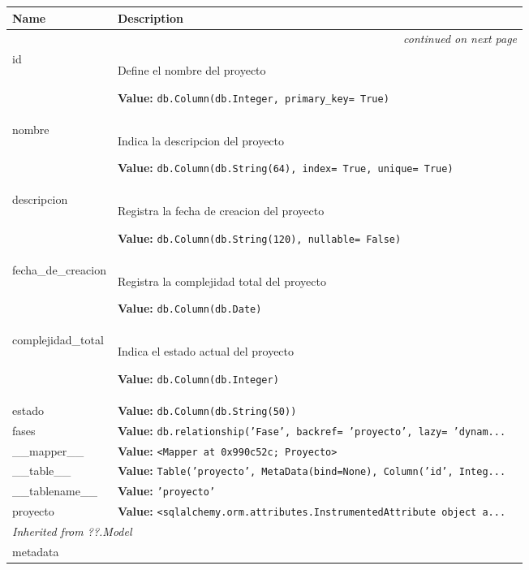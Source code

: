     \vspace{-1cm}
\hspace{\varindent}\begin{longtable}{|p{\varnamewidth}|p{\vardescrwidth}|l}
\cline{1-2}
\cline{1-2} \centering \textbf{Name} & \centering \textbf{Description}& \\
\cline{1-2}
\endhead\cline{1-2}\multicolumn{3}{r}{\small\textit{continued on next page}}\\\endfoot\cline{1-2}
\endlastfoot\raggedright i\-d\- & \raggedright Define el nombre del proyecto

\textbf{Value:} 
{\tt db.Column(db.Integer, primary\_key= True)}&\\
\cline{1-2}
\raggedright n\-o\-m\-b\-r\-e\- & \raggedright Indica la descripcion del proyecto

\textbf{Value:} 
{\tt db.Column(db.String(64), index= True, unique= True)}&\\
\cline{1-2}
\raggedright d\-e\-s\-c\-r\-i\-p\-c\-i\-o\-n\- & \raggedright Registra la fecha de creacion del proyecto

\textbf{Value:} 
{\tt db.Column(db.String(120), nullable= False)}&\\
\cline{1-2}
\raggedright f\-e\-c\-h\-a\-\_\-d\-e\-\_\-c\-r\-e\-a\-c\-i\-o\-n\- & \raggedright Registra la complejidad total del proyecto

\textbf{Value:} 
{\tt db.Column(db.Date)}&\\
\cline{1-2}
\raggedright c\-o\-m\-p\-l\-e\-j\-i\-d\-a\-d\-\_\-t\-o\-t\-a\-l\- & \raggedright Indica el estado actual del proyecto

\textbf{Value:} 
{\tt db.Column(db.Integer)}&\\
\cline{1-2}
\raggedright e\-s\-t\-a\-d\-o\- & \raggedright \textbf{Value:} 
{\tt db.Column(db.String(50))}&\\
\cline{1-2}
\raggedright f\-a\-s\-e\-s\- & \raggedright \textbf{Value:} 
{\tt db.relationship('Fase', backref= 'proyecto', lazy= 'dynam\texttt{...}}&\\
\cline{1-2}
\raggedright \_\-\_\-m\-a\-p\-p\-e\-r\-\_\-\_\- & \raggedright \textbf{Value:} 
{\tt {\textless}Mapper at 0x990c52c; Proyecto{\textgreater}}&\\
\cline{1-2}
\raggedright \_\-\_\-t\-a\-b\-l\-e\-\_\-\_\- & \raggedright \textbf{Value:} 
{\tt Table('proyecto', MetaData(bind=None), Column('id', Integ\texttt{...}}&\\
\cline{1-2}
\raggedright \_\-\_\-t\-a\-b\-l\-e\-n\-a\-m\-e\-\_\-\_\- & \raggedright \textbf{Value:} 
{\tt \texttt{'}\texttt{proyecto}\texttt{'}}&\\
\cline{1-2}
\raggedright p\-r\-o\-y\-e\-c\-t\-o\- & \raggedright \textbf{Value:} 
{\tt {\textless}sqlalchemy.orm.attributes.InstrumentedAttribute object a\texttt{...}}&\\
\cline{1-2}
\multicolumn{2}{|l|}{\textit{Inherited from ??.Model}}\\
\multicolumn{2}{|p{\varwidth}|}{\raggedright metadata}\\
\cline{1-2}
\end{longtable}

